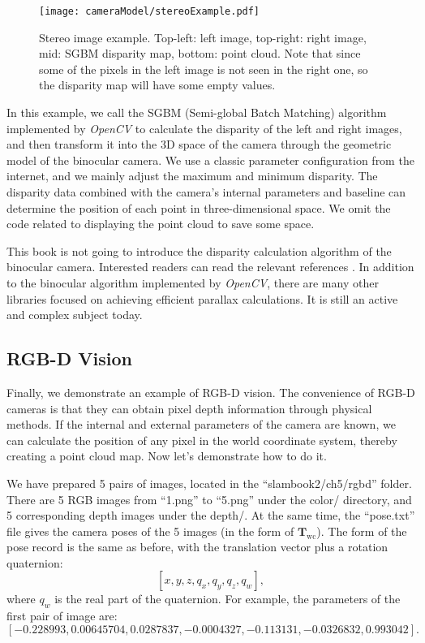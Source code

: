 \begin{figure}[!t]
    \centering
    \texttt{[image: cameraModel/stereoExample.pdf]}
    \caption{Stereo image example. Top-left: left image, top-right: right image, mid: SGBM disparity map, bottom: point cloud. Note that since some of the pixels in the left image is not seen in the right one, so the disparity map will have some empty values.}
    \label{fig:stereoExample}
\end{figure}

In this example, we call the SGBM (Semi-global Batch Matching) \textsuperscript{\cite{Hirschmuller2008}} algorithm implemented by \textit{OpenCV} to calculate the disparity of the left and right images, and then transform it into the 3D space of the camera through the geometric model of the binocular camera. We use a classic parameter configuration from the internet, and we mainly adjust the maximum and minimum disparity. The disparity data combined with the camera's internal parameters and baseline can determine the position of each point in three-dimensional space. We omit the code related to displaying the point cloud to save some space.

This book is not going to introduce the disparity calculation algorithm of the binocular camera. Interested readers can read the relevant references \textsuperscript{\cite{Scharstein2002, Seitz2006}}. In addition to the binocular algorithm implemented by \textit{OpenCV}, there are many other libraries focused on achieving efficient parallax calculations. It is still an active and complex subject today.

\subsection{RGB-D Vision}
\label{sec:join-point-cloud}
Finally, we demonstrate an example of RGB-D vision. The convenience of RGB-D cameras is that they can obtain pixel depth information through physical methods. If the internal and external parameters of the camera are known, we can calculate the position of any pixel in the world coordinate system, thereby creating a point cloud map. Now let's demonstrate how to do it.

We have prepared 5 pairs of images, located in the ``slambook2/ch5/rgbd'' folder. There are 5 RGB images from ``1.png'' to ``5.png'' under the color/ directory, and 5 corresponding depth images under the depth/. At the same time, the ``pose.txt'' file gives the camera poses of the 5 images (in the form of $ \mathbf{T}_\mathrm{wc} $). The form of the pose record is the same as before, with the translation vector plus a rotation quaternion:
\[
[x, y, z, q_x, q_y, q_z, q_w],
\]
where $q_w$ is the real part of the quaternion. For example, the parameters of the first pair of image are:
\[
[-0.228993, 0.00645704, 0.0287837, -0.0004327, -0.113131, -0.0326832, 0.993042].
\]

